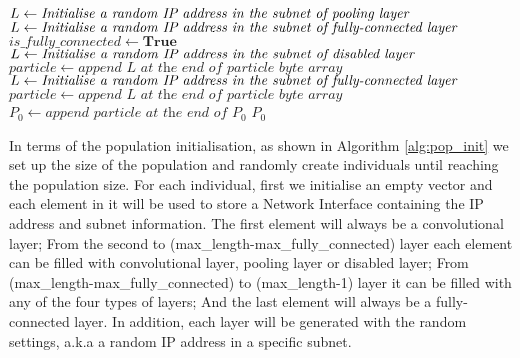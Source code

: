 \documentclass[conference]{IEEEtran}
\begin{document}
\begin{algorithm}
\begin{algorithmic}
						\STATE $L \leftarrow \textit{Initialise a random IP address } \newline \textit{in the subnet of pooling layer}$
						\STATE $L \leftarrow \textit{Initialise a random IP address } \newline \textit{in the subnet of fully-connected layer}$
						\STATE $is\_fully\_connected \leftarrow \textbf{True}$
					\ELSE
						\STATE $L \leftarrow \textit{Initialise a random IP address } \newline \textit{in the subnet of disabled layer}$
					\ENDIF
				\ENDIF
				\STATE $particle \leftarrow \textit{append L at the end of particle byte array}$
			\ENDWHILE
			\STATE $L \leftarrow \textit{Initialise a random IP address in the subnet of } \newline \textit{fully-connected layer}$
			\STATE $particle \leftarrow \textit{append L at the end of particle byte array}$
			\STATE $P_{0} \leftarrow \textit{append particle at the end of }P_{0}$
		\ENDWHILE
		\RETURN $P_{0}$
	\end{algorithmic}
\end{algorithm}

In terms of the population initialisation, as shown in Algorithm \ref{alg:pop_init} we set up the size of the population and randomly create individuals until reaching the population size. 
For each individual, first we initialise an empty vector and each element in it will be used to store a Network Interface containing the IP address and subnet information. The first element will always be a convolutional layer; From the second to (max\_length-max\_fully\_connected) layer each element can be filled with convolutional layer, pooling layer or disabled layer; From (max\_length-max\_fully\_connected) to (max\_length-1) layer it can be filled with any of the four types of layers; And the last element will always be a fully-connected layer. In addition, each layer will be generated with the random settings, a.k.a a random IP address in a specific subnet.
\end{document}
